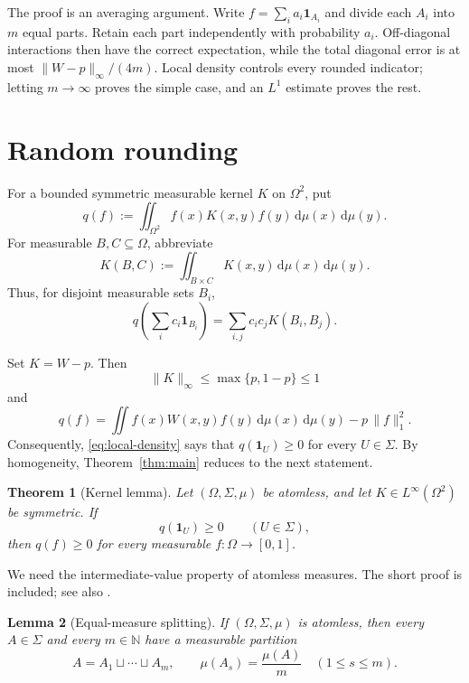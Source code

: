\documentclass[10pt,a4paper]{amsart}
\newtheorem{theorem}{Theorem}
\newtheorem{lemma}[theorem]{Lemma}
\newcommand{\one}{\mathbf 1}
\newcommand{\N}{\mathbb N}
\newcommand{\dd}{\,\mathrm d}
\newcommand{\norminf}[1]{\lVert #1\rVert_\infty}
\newcommand{\normone}[1]{\lVert #1\rVert_1}
\begin{document}
The proof is an averaging argument. Write
$f=\sum_i a_i\one_{A_i}$ and divide each $A_i$ into $m$ equal parts. Retain
each part independently with probability $a_i$. Off-diagonal interactions
then have the correct expectation, while the total diagonal error is at most
$\norminf{W-p}/(4m)$. Local density controls every rounded indicator; letting
$m\to\infty$ proves the simple case, and an $L^1$ estimate proves the rest.

\section{Random rounding}

For a bounded symmetric measurable kernel $K$ on $\Omega^2$, put
\begin{equation}\label{eq:q-def}
  q(f):=\iint_{\Omega^2}f(x)K(x,y)f(y)\dd\mu(x)\dd\mu(y).
\end{equation}
For measurable $B,C\subseteq\Omega$, abbreviate
\begin{equation}\label{eq:KBC}
  K(B,C):=\iint_{B\times C}K(x,y)\dd\mu(x)\dd\mu(y).
\end{equation}
Thus, for disjoint measurable sets $B_i$,
\begin{equation}\label{eq:block-form}
  q\!\left(\sum_i c_i\one_{B_i}\right)
  =\sum_{i,j}c_i c_j K(B_i,B_j).
\end{equation}

Set $K=W-p$. Then
\begin{equation}\label{eq:K-bound}
  \norminf{K}\leq\max\{p,1-p\}\leq1
\end{equation}
and
\begin{equation}\label{eq:reduction}
  q(f)=\iint f(x)W(x,y)f(y)\dd\mu(x)\dd\mu(y)
       -p\,\normone{f}^{2}.
\end{equation}
Consequently, \eqref{eq:local-density} says that $q(\one_U)\geq0$ for every
$U\in\Sigma$. By homogeneity, Theorem~\ref{thm:main} reduces to the next
statement.


\begin{theorem}[Kernel lemma]\label{thm:kernel}
Let $(\Omega,\Sigma,\mu)$ be atomless, and let
$K\in L^\infty(\Omega^2)$ be symmetric. If
\[
  q(\one_U)\geq0\qquad(U\in\Sigma),
\]
then $q(f)\geq0$ for every measurable $f\colon\Omega\to[0,1]$.
\end{theorem}


We need the intermediate-value property of atomless measures. The short proof
is included; see also \cite[\S215]{Fremlin}.

\begin{lemma}[Equal-measure splitting]\label{lem:splitting}
If $(\Omega,\Sigma,\mu)$ is atomless, then every $A\in\Sigma$ and every
$m\in\N$ have a measurable partition
\[
  A=A_1\sqcup\cdots\sqcup A_m,
  \qquad
  \mu(A_s)=\frac{\mu(A)}m\quad(1\leq s\leq m).
\]
\end{lemma}
\end{document}
